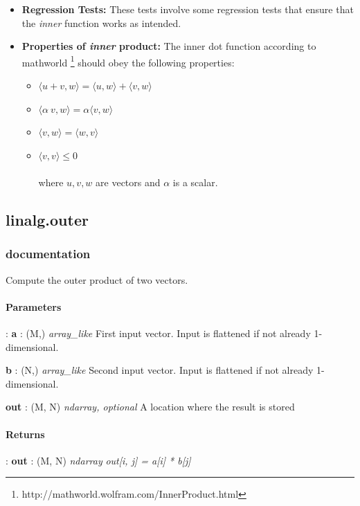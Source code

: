\documentclass[a4paper,11pt]{article}
\begin{document}
\begin{itemize}
	\item \textbf{Regression Tests:} These tests involve some regression tests that ensure that the \textit{inner} function works as intended.
	
	\item \textbf{Properties of \textit{inner} product:} The inner dot function according to mathworld \footnote{http://mathworld.wolfram.com/InnerProduct.html} should obey the following properties:
	
	\begin{itemize}
		\item[1.] $ \langle u + v,w \rangle = \langle u , w \rangle + \langle v , w \rangle $ 
		\item[2.] $ \langle \alpha~v,w \rangle = \alpha \langle v , w \rangle $
		\item[3.] $ \langle v,w \rangle = \langle w, v \rangle $
		\item[4.] $ \langle v,v \rangle \leq 0 $
		\\
		\\ where $ u, v, w $ are vectors and $ \alpha $ is a scalar.
	\end{itemize}
	
\end{itemize}

\subsection{linalg.outer}
\subsubsection{documentation}
Compute the outer product of two vectors.

\paragraph{Parameters}:	
\textbf{a} : (M,) \textit{array\_like} First input vector. Input is flattened if not already 1-dimensional.

\textbf{b} : (N,) \textit{array\_like} Second input vector. Input is flattened if not already 1-dimensional.

\textbf{out} : (M, N) \textit{ndarray, optional} A location where the result is stored

\paragraph{Returns}: \textbf{out} : (M, N) \textit{ndarray} \textit{out[i, j] = a[i] * b[j]}
\end{document}
